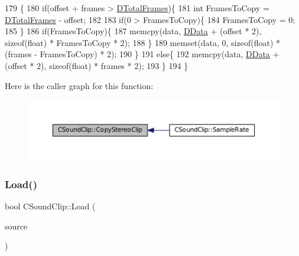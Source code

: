 \begin{DoxyCode}
179                                                                   \{
180     \textcolor{keywordflow}{if}(offset + frames > \hyperlink{classCSoundClip_ab0d9eb261d09fa2a106658276f37285b}{DTotalFrames})\{
181         \textcolor{keywordtype}{int} FramesToCopy = \hyperlink{classCSoundClip_ab0d9eb261d09fa2a106658276f37285b}{DTotalFrames} - offset;
182         
183         \textcolor{keywordflow}{if}(0 > FramesToCopy)\{
184             FramesToCopy = 0;
185         \}
186         \textcolor{keywordflow}{if}(FramesToCopy)\{
187             memcpy(data, \hyperlink{classCSoundClip_a220921a0c81e5c63e2cd3c55c75878b1}{DData} + (offset * 2), \textcolor{keyword}{sizeof}(\textcolor{keywordtype}{float}) * FramesToCopy * 2);
188         \}
189         memset(data, 0, \textcolor{keyword}{sizeof}(\textcolor{keywordtype}{float}) * (frames - FramesToCopy) * 2);
190     \}
191     \textcolor{keywordflow}{else}\{
192         memcpy(data, \hyperlink{classCSoundClip_a220921a0c81e5c63e2cd3c55c75878b1}{DData} + (offset * 2), \textcolor{keyword}{sizeof}(\textcolor{keywordtype}{float}) * frames * 2);
193     \}
194 \}
\end{DoxyCode}
Here is the caller graph for this function\+:
\nopagebreak
\begin{figure}[H]
\begin{center}
\leavevmode
\includegraphics[width=350pt]{classCSoundClip_a9cc8dd683c638331b2d0532aa68149da_icgraph}
\end{center}
\end{figure}
\hypertarget{classCSoundClip_a4b8a88d0062844969cbe1ab763c3590a}{}\label{classCSoundClip_a4b8a88d0062844969cbe1ab763c3590a} 
\subsubsection{\texorpdfstring{Load()}{Load()}}
{\footnotesize\ttfamily bool C\+Sound\+Clip\+::\+Load (\begin{DoxyParamCaption}\item[{std\+::shared\+\_\+ptr$<$ \hyperlink{classCDataSource}{C\+Data\+Source} $>$}]{source }\end{DoxyParamCaption})}




